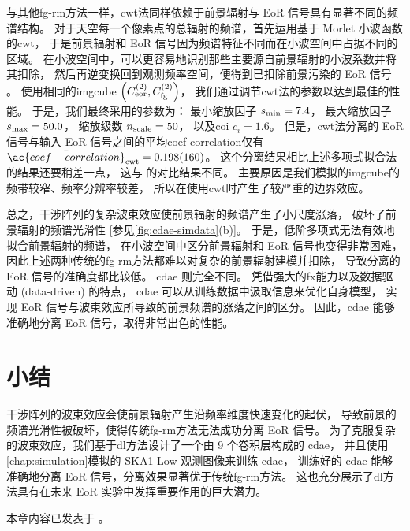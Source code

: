 与其他\ac{fg-rm}方法一样，\ac{cwt}法同样依赖于前景辐射与 EoR 信号具有显著不同的频谱结构。
对于天空每一个像素点的总辐射的频谱，首先运用基于 Morlet 小波函数的\ac{cwt}，
于是前景辐射和 EoR 信号因为频谱特征不同而在小波空间中占据不同的区域。
在小波空间中，可以更容易地识别那些主要源自前景辐射的小波系数并将其扣除，
然后再逆变换回到观测频率空间，便得到已扣除前景污染的 EoR 信号 \cite{gu2013}。
使用相同的\ac{imgcube}
$\left( C_{\mathrm{eor}}^{(2)}, C_{\mathrm{fg}}^{(2)} \right)$，
我们通过调节\ac{cwt}法的参数以达到最佳的性能。
于是，我们最终采用的参数为：
最小缩放因子 $s_{\mathrm{min}} = 7.4$，
最大缩放因子 $s_{\mathrm{max}} = 50.0$，
缩放级数 $n_{\mathrm{scale}} = 50$，
以及\ac{coi} $c_i = 1.6$。
但是，\ac{cwt}法分离的 EoR 信号与输入 EoR 信号之间的平均\acl{coef-correlation}仅有
$\bar{\ac{coef-correlation}}_{\R{cwt}} = \num{0.198 +- 0.160}$。
这个分离结果相比上述多项式拟合法的结果还要稍差一点，
这与  的对比结果不同。
主要原因是我们模拟的\ac{imgcube}的频带较窄、频率分辨率较差，
所以在使用\ac{cwt}时产生了较严重的边界效应。

总之，干涉阵列的复杂波束效应使前景辐射的频谱产生了小尺度涨落，
破坏了前景辐射的频谱光滑性 [参见\autoref{fig:cdae-simdata}(b)]。
于是，低阶多项式无法有效地拟合前景辐射的频谱，
在小波空间中区分前景辐射和 EoR 信号也变得非常困难，
因此上述两种传统的\ac{fg-rm}方法都难以对复杂的前景辐射建模并扣除，
导致分离的 EoR 信号的准确度都比较低。
\ac{cdae} 则完全不同。
凭借强大的\ac{fx}能力以及数据驱动 (data-driven) 的特点，
\ac{cdae} 可以从训练数据中汲取信息来优化自身模型，
实现 EoR 信号与波束效应所导致的前景频谱的涨落之间的区分。
因此，\ac{cdae} 能够准确地分离 EoR 信号，取得非常出色的性能。


\section{小结}

干涉阵列的波束效应会使前景辐射产生沿频率维度快速变化的起伏，
导致前景的频谱光滑性被破坏，使得传统\ac{fg-rm}方法无法成功分离 EoR 信号。
为了克服复杂的波束效应，我们基于\ac{dl}方法设计了一个由 9 个卷积层构成的 \ac{cdae}，
并且使用\autoref{chap:simulation}模拟的 SKA1-Low 观测图像来训练 \ac{cdae}，
训练好的 \ac{cdae} 能够准确地分离 EoR 信号，分离效果显著优于传统\ac{fg-rm}方法。
这也充分展示了\ac{dl}方法具有在未来 EoR 实验中发挥重要作用的巨大潜力。

本章内容已发表于 \textit{\mnras} \cite{li.cdae}。


